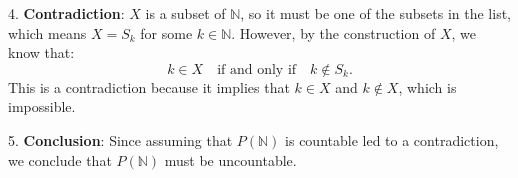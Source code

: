 \documentclass[12pt]{article}
\begin{document}
4. \textbf{Contradiction}: \( X \) is a subset of \( \mathbb{N} \), so it must be one of the subsets in the list, which means \( X = S_k \) for some \( k \in \mathbb{N} \). However, by the construction of \( X \), we know that:
   \[
   k \in X \quad \text{if and only if} \quad k \notin S_k.
   \]
   This is a contradiction because it implies that \( k \in X \) and \( k \notin X \), which is impossible.\newline

5. \textbf{Conclusion}: Since assuming that \( P(\mathbb{N}) \) is countable led to a contradiction, we conclude that \( P(\mathbb{N}) \) must be uncountable.
\vspace{12pt}
\end{document}
